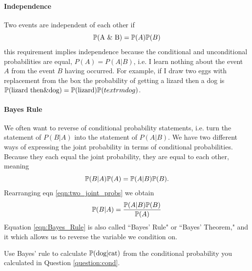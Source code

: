 \paragraph{Independence}
Two events are independent of each other if
\begin{equation}
\P(\textrm{A \& B}) = \P(A) \P(B) \label{eqn:basic_indie}
\end{equation}
this requirement implies independence because the conditional and
unconditional probabilities are equal, $P(A) = P(A | B)$, i.e. I learn
nothing about the event $A$ from the event $B$ having occurred. 
For example, if I draw two eggs with replacement from the box the
probability of getting a lizard then a dog is $\P(\textrm{lizard then} \& \textrm{dog}) =
\P(\textrm{lizard}) \P( textrm{dog})$. 


\paragraph{Bayes Rule}
We often want to reverse of conditional probability statements,
i.e. turn the statement of $P(B | A)$ into the statement of $P(A |
B)$. 
We have two different ways of expressing the joint probability in terms of conditional probabilities. Because they each equal the joint probability, they are equal to each other, meaning
\begin{equation}
\P(B | A) \P(A) =  \P(A | B) \P(B) . \label{eqn:two_joint_probs}
 \end{equation}
Rearranging eqn \eqref{eqn:two_joint_probs} we obtain 
\begin{equation}
\P(B | A) =  \frac{\P(A | B) \P(B) }{\P(A)} \label{eqn:Bayes_Rule}
 \end{equation}
Equation \eqref{eqn:Bayes_Rule} is also called ``Bayes' Rule" or ``Bayes' Theorem," and it  which allows us to reverse the variable we
condition on. 
\begin{question}
Use Bayes' rule to calculate $\P(\textrm{dog} | \textrm{cat})$ from
the conditional probability you calculated in Question
\ref{question:cond}.\\
 \end{question}

